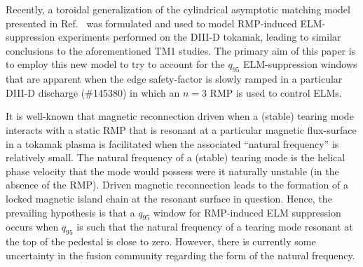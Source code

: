 \documentclass[12pt,prb,aps]{revtex4-1}
\begin{document}
Recently, a toroidal generalization of the 
cylindrical asymptotic matching model presented
in Ref.~ was formulated and
used to model  RMP-induced ELM-suppression experiments performed on the DIII-D tokamak,\cite{rf2}
leading to similar conclusions to the aforementioned TM1
studies. The primary aim of this paper is to employ this
new model to try to account for the  $q_{95}$
ELM-suppression windows  that are apparent when the edge safety-factor is slowly ramped in
a particular DIII-D discharge (\#145380) in which an $n=3$
RMP is used to control ELMs.\cite{d3d,d3d2} 

It is well-known that magnetic reconnection driven when a  (stable) tearing mode interacts with a static RMP that is resonant at a particular magnetic flux-surface in a tokamak plasma is
facilitated when the associated ``natural frequency'' is relatively small.\cite{rfa,rfb}  The natural frequency  of a  (stable) tearing mode is the
helical phase velocity that the mode would possess were it naturally unstable (in the absence of the RMP).  Driven magnetic reconnection leads to the
formation of a locked magnetic island chain at the resonant surface in question. 
Hence, the prevailing hypothesis is that a $q_{95}$ window for
RMP-induced ELM suppression occurs when $q_{95}$ is such that the natural frequency of a tearing mode resonant  at 
the top of the pedestal is close to zero.\cite{d3d} 
However, there is currently some uncertainty in the fusion community regarding the form of the natural frequency. 
\end{document}
